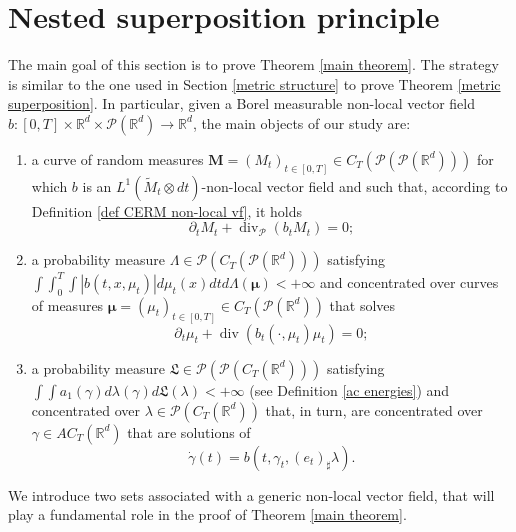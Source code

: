 \documentclass[10pt,leqno]{amsart}
\numberwithin{equation}{section}
\newcommand{\R}{\mathbb{R}}
\newcommand{\PP}{\mathcal{P}}
\begin{document}
\section{Nested superposition principle}\label{superposition}
The main goal of this section is to prove Theorem \ref{main theorem}. The strategy is similar to the one used in Section \ref{metric structure} to prove Theorem \ref{metric superposition}. In particular, given a Borel measurable non-local vector field $b:[0,T]\times \R^d \times \PP(\R^d) \to \R^d$, the main objects of our study are:
\begin{enumerate}[label=(\roman*)]
    \item a curve of random measures $\boldsymbol{M} = (M_t)_{t\in [0,T]}\in C_T(\PP(\PP(\R^d)))$ for which $b$ is an $L^1(\widetilde{M}_t\otimes dt)$-non-local vector field and such that, according to Definition \ref{def CERM non-local vf}, it holds 
    \begin{equation}
        \partial_t M_t+\operatorname{div}_\PP(b_tM_t) = 0;
    \end{equation}
    \item\label{item ii} a probability measure $\Lambda \in \PP(C_T(\PP(\R^d)))$ satisfying $\int \int_0^T  \int |b(t,x,\mu_t)| d\mu_t(x) dt d\Lambda(\boldsymbol{\mu}) <+\infty$ and concentrated over curves of measures $\boldsymbol{\mu}=(\mu_t)_{t\in [0,T]}\in C_T(\PP(\R^d))$ that solves
    \begin{equation}
        \partial_t \mu_t + \operatorname{div}(b_t(\cdot,\mu_t)\mu_t) = 0;
    \end{equation}
    \item\label{item iii} a probability measure $\mathfrak{L}\in \PP(\PP(C_T(\R^d)))$ satisfying $\int \int a_1(\gamma) d\lambda(\gamma)d\mathfrak{L}(\lambda)<+\infty$ (see Definition \ref{ac energies}) and concentrated over $\lambda \in \PP(C_T(\R^d))$ that, in turn, are concentrated over $\gamma\in AC_T(\R^d)$ that are solutions of 
    \begin{equation}\label{particle systems section 5}
        \dot\gamma(t) = b(t,\gamma_t,(e_t)_\sharp \lambda).
    \end{equation}
\end{enumerate}

We introduce two sets associated with a generic non-local vector field, that will play a fundamental role in the proof of Theorem \ref{main theorem}.
\end{document}
